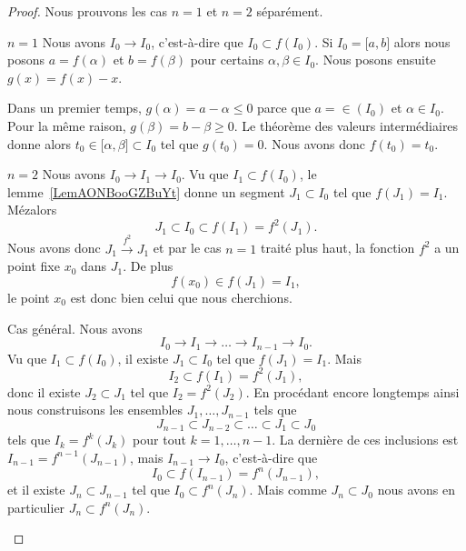 \begin{proof}
	Nous prouvons les cas \( n=1\) et \( n=2\) séparément.
	\begin{subproof}
		\item[\( n=1\)]
		Nous avons \( I_0\to I_0\), c'est-à-dire que $I_0\subset f(I_0)$. Si \( I_0=\mathopen[ a , b \mathclose]\) alors nous posons \( a=f(\alpha)\) et \( b=f(\beta)\) pour certains \( \alpha,\beta\in I_0\). Nous posons ensuite \( g(x)=f(x)-x\).

		Dans un premier temps, \( g(\alpha)=a-\alpha\leq 0\) parce que \( a=\in(I_0)\) et \( \alpha\in I_0\). Pour la même raison, \( g(\beta)=b-\beta\geq 0\). Le théorème des valeurs intermédiaires donne alors \( t_0\in \mathopen[ \alpha , \beta \mathclose]\subset I_0\) tel que \( g(t_0)=0\). Nous avons donc \( f(t_0)=t_0\).
		\item[\( n=2\)]
		Nous avons \( I_0\to I_1\to I_0\). Vu que \( I_1\subset f(I_0)\), le lemme~\ref{LemAONBooGZBuYt} donne un segment \( J_1\subset I_0\) tel que \( f(J_1)=I_1\). Mézalors
		\begin{equation}
			J_1\subset I_0\subset f(I_1)=f^2(J_1).
		\end{equation}
		Nous avons donc \( J_1\stackrel{f^2}{\longrightarrow}J_1\) et par le cas \( n=1\) traité plus haut, la fonction \( f^2 \) a un point fixe \( x_0\) dans \( J_1\). De plus
		\begin{equation}
			f(x_0)\in f(J_1)=I_1,
		\end{equation}
		le point \( x_0\) est donc bien celui que nous cherchions.
		\item
		Cas général. Nous avons
		\begin{equation}
			I_0\to I_1\to\ldots\to I_{n-1}\to I_0.
		\end{equation}
		Vu que \( I_1\subset f(I_0)\), il existe \( J_1\subset I_0\) tel que \( f(J_1)=I_1\). Mais
		\begin{equation}
			I_2\subset f(I_1)=f^2(J_1),
		\end{equation}
		donc il existe \( J_2\subset J_1\) tel que \( I_2=f^2(J_2)\). En procédant encore longtemps ainsi nous construisons les ensembles \( J_1,\ldots, J_{n-1}\) tels que
		\begin{equation}
			J_{n-1}\subset J_{n-2}\subset\ldots\subset J_1\subset J_0
		\end{equation}
		tels que \( I_k=f^k(J_k)\) pour tout \( k=1,\ldots, n-1\). La dernière de ces inclusions est \( I_{n-1}=f^{n-1}(J_{n-1})\), mais \( I_{n-1}\to I_0\), c'est-à-dire que
		\begin{equation}
			I_0\subset f(I_{n-1})=f^n(J_{n-1}),
		\end{equation}
		et il existe \( J_n\subset J_{n-1}\) tel que \( I_0\subset f^n(J_n)\). Mais comme \( J_n\subset J_0\) nous avons en particulier \( J_n\subset f^n(J_n)\).


\end{subproof}
\end{proof}
